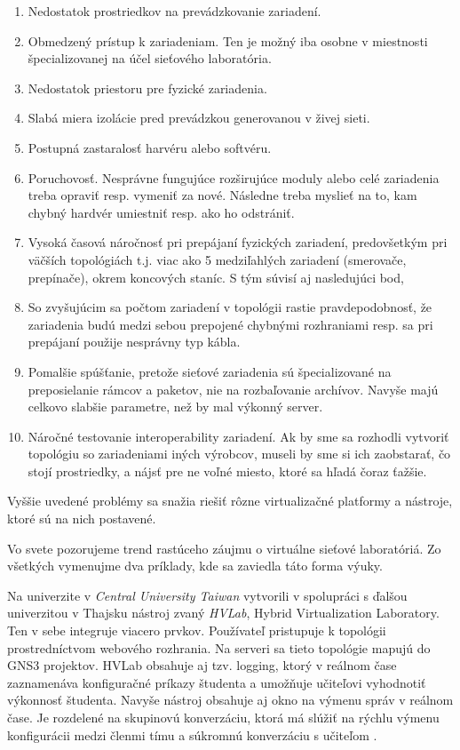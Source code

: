 \begin{enumerate}[noitemsep]
    \item Nedostatok prostriedkov na prevádzkovanie zariadení.
    \item Obmedzený prístup k zariadeniam. Ten je možný iba osobne v miestnosti špecializovanej na účel sieťového laboratória.
    \item Nedostatok priestoru pre fyzické zariadenia.
    \item Slabá miera izolácie pred prevádzkou generovanou v živej sieti.
    \item Postupná zastaralosť harvéru alebo softvéru.
    \item Poruchovosť. Nesprávne fungujúce rozširujúce moduly alebo celé zariadenia treba opraviť resp. vymeniť za nové. Následne treba myslieť na to, kam chybný hardvér umiestniť resp. ako ho odstrániť.
    \item Vysoká časová náročnosť pri prepájaní fyzických zariadení, predovšetkým pri väčších topológiách t.j. viac ako 5 medziľahlých zariadení (smerovače, prepínače), okrem koncových staníc. S tým súvisí aj nasledujúci bod,
    \item So zvyšujúcim sa počtom zariadení v topológii rastie pravdepodobnosť, že zariadenia budú medzi sebou prepojené chybnými rozhraniami resp. sa pri prepájaní použije nesprávny typ kábla.
    \item Pomalšie spúšťanie, pretože sieťové zariadenia sú špecializované na preposielanie rámcov a paketov, nie na rozbaľovanie archívov. Navyše majú celkovo slabšie parametre, než by mal výkonný server.
    \item Náročné testovanie interoperability zariadení. Ak by sme sa rozhodli vytvoriť topológiu so zariadeniami iných výrobcov, museli by sme si ich zaobstarať, čo stojí prostriedky, a nájsť pre ne voľné miesto, ktoré sa hľadá čoraz ťažšie.
\end{enumerate}

Vyššie uvedené problémy sa snažia riešiť rôzne virtualizačné platformy a nástroje, ktoré sú na nich postavené.

Vo svete pozorujeme trend rastúceho záujmu o virtuálne sieťové laboratóriá. Zo všetkých vymenujme dva príklady, kde sa zaviedla táto forma výuky.

Na univerzite v \emph{Central University Taiwan} vytvorili v spolupráci s ďalšou univerzitou v Thajsku nástroj zvaný \emph{HVLab}, Hybrid Virtualization Laboratory. Ten v sebe integruje viacero prvkov. Používateľ pristupuje k topológii prostredníctvom webového rozhrania. Na serveri sa tieto topológie mapujú do GNS3 projektov. HVLab obsahuje aj tzv. logging, ktorý v reálnom čase zaznamenáva konfiguračné príkazy študenta a umožňuje učiteľovi vyhodnotiť výkonnosť študenta. Navyše nástroj obsahuje aj okno na výmenu správ v reálnom čase. Je rozdelené na skupinovú konverzáciu, ktorá má slúžiť na rýchlu výmenu konfigurácii medzi členmi tímu a súkromnú konverzáciu s učiteľom \cite{hvlab}.

